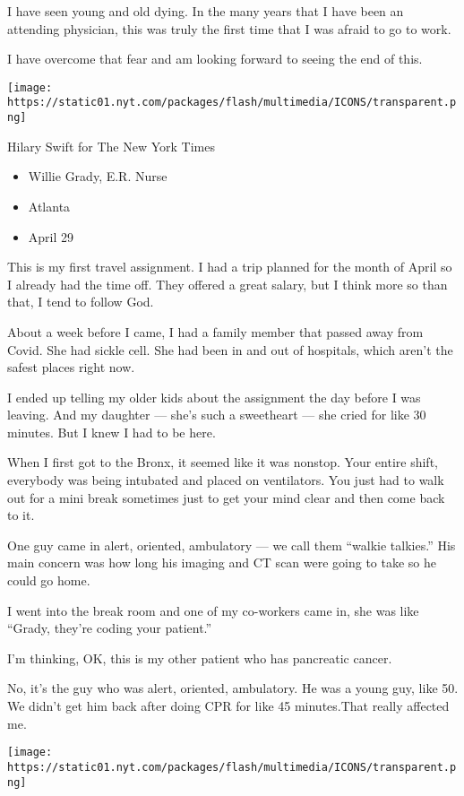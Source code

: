 I have seen young and old dying. In the many years that I have been an
attending physician, this was truly the first time that I was afraid to
go to work.

I have overcome that fear and am looking forward to seeing the end of
this.

\texttt{[image: https://static01.nyt.com/packages/flash/multimedia/ICONS/transparent.png]}

Hilary Swift for The New York Times

\begin{itemize}
\tightlist
\item
  Willie Grady, E.R. Nurse
\item
  Atlanta
\item
  April 29
\end{itemize}

This is my first travel assignment. I had a trip planned for the month
of April so I already had the time off. They offered a great salary, but
I think more so than that, I tend to follow God.

About a week before I came, I had a family member that passed away from
Covid. She had sickle cell. She had been in and out of hospitals, which
aren't the safest places right now.

I ended up telling my older kids about the assignment the day before I
was leaving. And my daughter --- she's such a sweetheart --- she cried
for like 30 minutes. But I knew I had to be here.

When I first got to the Bronx, it seemed like it was nonstop. Your
entire shift, everybody was being intubated and placed on ventilators.
You just had to walk out for a mini break sometimes just to get your
mind clear and then come back to it.

One guy came in alert, oriented, ambulatory --- we call them ``walkie
talkies.'' His main concern was how long his imaging and CT scan were
going to take so he could go home.

I went into the break room and one of my co-workers came in, she was
like ``Grady, they're coding your patient.''

I'm thinking, OK, this is my other patient who has pancreatic cancer.

No, it's the guy who was alert, oriented, ambulatory. He was a young
guy, like 50. We didn't get him back after doing CPR for like 45
minutes.That really affected me.

\texttt{[image: https://static01.nyt.com/packages/flash/multimedia/ICONS/transparent.png]}

